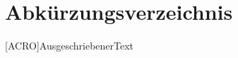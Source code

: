 %




\newpage

\section*{Abkürzungsverzeichnis}

\begin{acronym}[ACRO] %
	[ACRO]{AusgeschriebenerText}
\end{acronym}